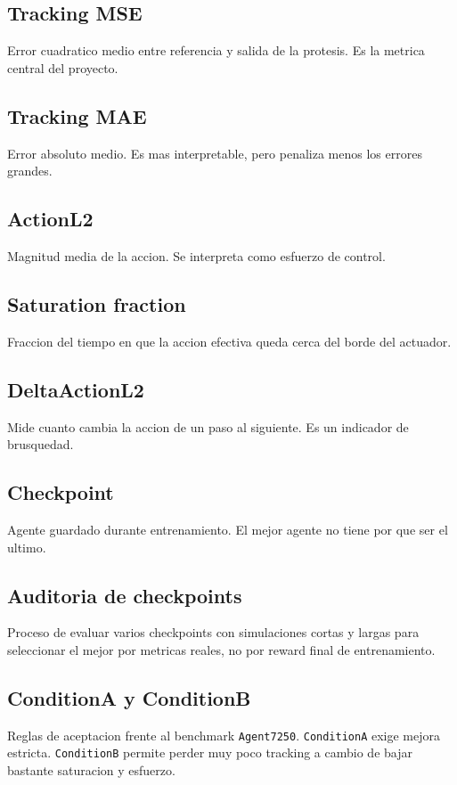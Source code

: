 \documentclass[11pt,a4paper]{article}
\begin{document}
\subsection*{Tracking MSE}
Error cuadratico medio entre referencia y salida de la protesis. Es la metrica central del proyecto.

\subsection*{Tracking MAE}
Error absoluto medio. Es mas interpretable, pero penaliza menos los errores grandes.

\subsection*{ActionL2}
Magnitud media de la accion. Se interpreta como esfuerzo de control.

\subsection*{Saturation fraction}
Fraccion del tiempo en que la accion efectiva queda cerca del borde del actuador.

\subsection*{DeltaActionL2}
Mide cuanto cambia la accion de un paso al siguiente. Es un indicador de brusquedad.

\subsection*{Checkpoint}
Agente guardado durante entrenamiento. El mejor agente no tiene por que ser el ultimo.

\subsection*{Auditoria de checkpoints}
Proceso de evaluar varios checkpoints con simulaciones cortas y largas para seleccionar el mejor por metricas reales, no por reward final de entrenamiento.

\subsection*{ConditionA y ConditionB}
Reglas de aceptacion frente al benchmark \texttt{Agent7250}. \texttt{ConditionA} exige mejora estricta. \texttt{ConditionB} permite perder muy poco tracking a cambio de bajar bastante saturacion y esfuerzo.
\end{document}
